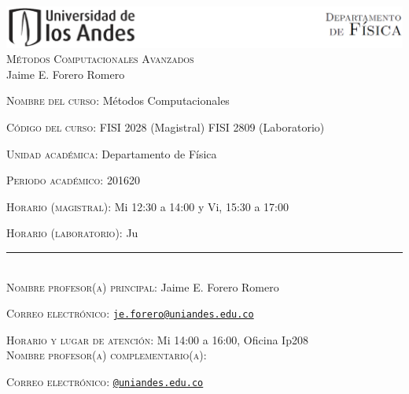 \documentclass[letterpaper,10pt,onecolumn]{article}
\begin{document}
\begin{center}

\includegraphics[width=490pt]{header.png}\\[0.5cm]

\textsc{\LARGE M\'etodos Computacionales Avanzados}\\[0.1cm]

\large Jaime E. Forero Romero\\[0.5cm]

\end{center}

\large \noindent\textsc{Nombre del curso:}  M\'etodos Computacionales%
  
\noindent\textsc{C\'odigo del curso:} FISI 2028 (Magistral) FISI 2809 (Laboratorio) %

\noindent\textsc{Unidad acad\'emica:} Departamento de F\'isica

\noindent\textsc{Periodo acad\'emico:} 201620 %

\noindent\textsc{Horario (magistral):} Mi 12:30 a 14:00 y Vi, 15:30 a
17:00 %

\noindent\textsc{Horario (laboratorio):} Ju\

\noindent\rule{\textwidth}{1pt}\\[-0.3cm]

\normalsize \noindent\textsc{Nombre profesor(a) principal:} Jaime
E. Forero Romero%

\noindent\textsc{Correo electr\'onico:}
\href{mailto:je.forero@uniandes.edu.co}{\nolinkurl{je.forero@uniandes.edu.co}}

\noindent\textsc{Horario y lugar de atenci\'on:} Mi 14:00 a 16:00, Oficina Ip208 
\\[-0.1cm]

\noindent\textsc{Nombre profesor(a) complementario(a):} %

\noindent\textsc{Correo electr\'onico:}
\href{mailto:@uniandes.edu.co}{\nolinkurl{@uniandes.edu.co}}
\end{document}
